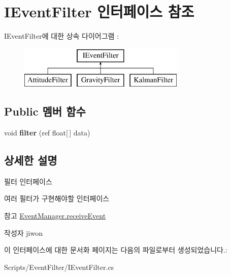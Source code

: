 \hypertarget{interface_i_event_filter}{}\section{I\+Event\+Filter 인터페이스 참조}
\label{interface_i_event_filter}
I\+Event\+Filter에 대한 상속 다이어그램 \+: \begin{figure}[H]
\begin{center}
\leavevmode
\includegraphics[height=2.000000cm]{interface_i_event_filter}
\end{center}
\end{figure}
\subsection*{Public 멤버 함수}
\begin{DoxyCompactItemize}
\item 
\hypertarget{interface_i_event_filter_aa70c90ea957214088b4c4cbb275a6714}{}void {\bfseries filter} (ref float\mbox{[}$\,$\mbox{]} data)\label{interface_i_event_filter_aa70c90ea957214088b4c4cbb275a6714}

\end{DoxyCompactItemize}


\subsection{상세한 설명}
필터 인터페이스

여러 필터가 구현해야할 인터페이스 \begin{DoxySeeAlso}{참고}
\hyperlink{class_event_manager_ae034ed89247a369411c89f135c836bd9}{Event\+Manager.\+receive\+Event} 
\end{DoxySeeAlso}
\begin{DoxyAuthor}{작성자}
jiwon 
\end{DoxyAuthor}


이 인터페이스에 대한 문서화 페이지는 다음의 파일로부터 생성되었습니다.\+:\begin{DoxyCompactItemize}
\item 
Scripts/\+Event\+Filter/I\+Event\+Filter.\+cs\end{DoxyCompactItemize}
